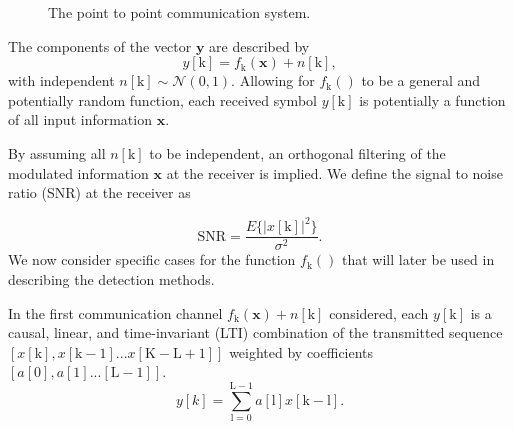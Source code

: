 \documentclass[12pt,a4paper]{report}
\begin{document}
\begin{figure}[H]
\caption{The point to point communication system.}
\label{fig:model}
\end{figure}

The components of the vector $\mathbf{y}$ are described by 
\begin{equation*}
y[\text{k}] = f_{\text{k}}(\mathbf{x}) + n[\text{k}],
\end{equation*}
with independent $n[\text{k}]\sim \mathcal{N}(0,1).$
Allowing for $f_{\text{k}}()$ to be a general and potentially random function, each received symbol $y[\text{k}]$ is potentially a function of all input information $\mathbf{x}$.

By assuming all $n[\text{k}]$ to be independent, an orthogonal filtering of the modulated information $\mathbf{x}$ at the receiver is implied. We define the signal to noise ratio (SNR) at the receiver as 

\begin{equation*}
\text{SNR} = \frac{E\{|x[\text{k}]|^2\}}{\sigma^2}.
\end{equation*}
	We now consider specific cases for the function $f_{\text{k}}()$ that will later be used in describing the detection methods. 
	\par
In the first communication channel $f_{\text{k}}(\mathbf{x}) + n[\text{k}]$ considered, each $y[\text{k}]$ is a causal, linear, and time-invariant (LTI) combination of the transmitted sequence $[x[\text{k}], x[\text{k}-1]... x[\text{K}-\text{L}+1]]$ weighted by coefficients $[a[0], a[1].. . [\text{L}-1]]$. 
\begin{equation*}
y[k] = \sum_{\mathrm{\text{l}=0}}^{\mathrm{\text{L}-1}} a[\text{l}]x[\text{k}-\text{l}].
\end{equation*}
\end{document}
